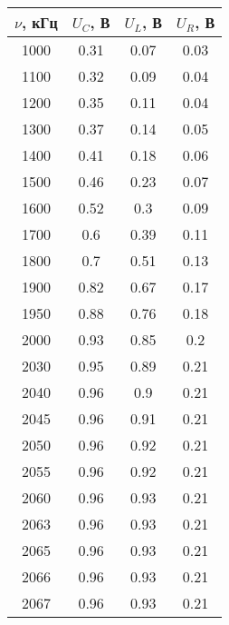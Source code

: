 \documentclass[a4paper, usenames, dvipsnames]{article}
\begin{document}
\begin{table}[p]
    \centering
    \begin{tabular}{|c|c|c|c|}
        \hline
        $\nu$, кГц & $U_C$, В & $U_L$, В & $U_R$, В \\
        \hline
        1000       & 0.31     & 0.07     & 0.03     \\
        \hline
        1100       & 0.32     & 0.09     & 0.04     \\
        \hline
        1200       & 0.35     & 0.11     & 0.04     \\
        \hline
        1300       & 0.37     & 0.14     & 0.05     \\
        \hline
        1400       & 0.41     & 0.18     & 0.06     \\
        \hline
        1500       & 0.46     & 0.23     & 0.07     \\
        \hline
        1600       & 0.52     & 0.3      & 0.09     \\
        \hline
        1700       & 0.6      & 0.39     & 0.11     \\
        \hline
        1800       & 0.7      & 0.51     & 0.13     \\
        \hline
        1900       & 0.82     & 0.67     & 0.17     \\
        \hline
        1950       & 0.88     & 0.76     & 0.18     \\
        \hline
        2000       & 0.93     & 0.85     & 0.2      \\
        \hline
        2030       & 0.95     & 0.89     & 0.21     \\
        \hline
        2040       & 0.96     & 0.9      & 0.21     \\
        \hline
        2045       & 0.96     & 0.91     & 0.21     \\
        \hline
        2050       & 0.96     & 0.92     & 0.21     \\
        \hline
        2055       & 0.96     & 0.92     & 0.21     \\
        \hline
        2060       & 0.96     & 0.93     & 0.21     \\
        \hline
        2063       & 0.96     & 0.93     & 0.21     \\
        \hline
        2065       & 0.96     & 0.93     & 0.21     \\
        \hline
        2066       & 0.96     & 0.93     & 0.21     \\
        \hline
        2067       & 0.96     & 0.93     & 0.21     \\

\end{tabular}
\end{table}
\end{document}
